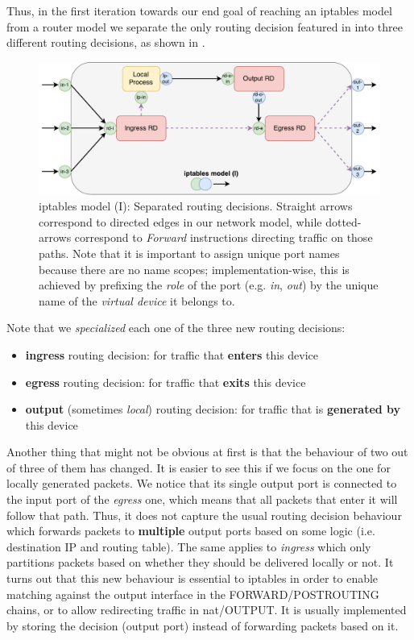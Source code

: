Thus, in the first iteration towards our end goal of reaching an iptables model
from a router model we separate the only routing decision featured in
 into three different routing
decisions, as shown in .

\begin{figure}[h]
  \centering
  \captionsetup{justification=centering}
  \includegraphics[scale=0.5]{assets/img/iptables-1}
  \caption[iptables model (I): Separated routing decisions.]{iptables model
  (I): Separated routing decisions.  Straight arrows correspond to directed
  edges in our network model, while dotted-arrows correspond to \emph{Forward}
  instructions directing traffic on those paths. Note that it is important to
  assign unique port names because there are no name scopes;
  implementation-wise, this is achieved by prefixing the \emph{role} of the
  port (e.g.  \emph{in}, \emph{out}) by the unique name of the \emph{virtual
  device} it belongs to.}
  \label{fig:iptables-1}
\end{figure}

Note that we \emph{specialized} each one of the three new routing decisions:
\begin{itemize}
  \item \textbf{ingress} routing decision: for traffic that \textbf{enters}
    this device
  \item \textbf{egress} routing decision: for traffic that \textbf{exits} this
    device
  \item \textbf{output} (sometimes \emph{local}) routing decision: for traffic
    that is \textbf{generated by} this device
\end{itemize}

Another thing that might not be obvious at first is that the behaviour of two
out of three of them has changed.  It is easier to see this if we focus on the
one for locally generated packets.  We notice that its single output port is
connected to the input port of the \emph{egress} one, which means that all
packets that enter it will follow that path.  Thus, it does not capture the
usual routing decision behaviour which forwards packets to \textbf{multiple}
output ports based on some logic (i.e. destination IP and routing table).  The
same applies to \emph{ingress} which only partitions packets based on whether
they should be delivered locally or not.  It turns out that this new behaviour
is essential to iptables in order to enable matching against the output
interface in the FORWARD/POSTROUTING chains, or to allow redirecting traffic in
nat/OUTPUT.  It is usually implemented by storing the decision (output port)
instead of forwarding packets based on it.

